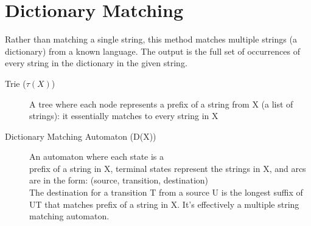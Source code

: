 \section{Dictionary Matching}
Rather than matching a single string, this method matches multiple strings (a dictionary) from a known language. The output is the full set of occurrences of every string in the dictionary in the given string. 
\begin{description}
    \item[Trie ($\tau(X)$)] A tree where each node represents a prefix of a string from X (a list of strings): it essentially matches to every string in X
    \item[Dictionary Matching Automaton (D(X))] An automaton where each state is a \\prefix of a string in X, terminal states represent the strings in X, and arcs are in the form: (source, transition, destination) \\
        The destination for a transition T from a source U is the longest suffix of UT that matches prefix of a string in X. It's effectively a multiple string matching automaton.
\end{description}

